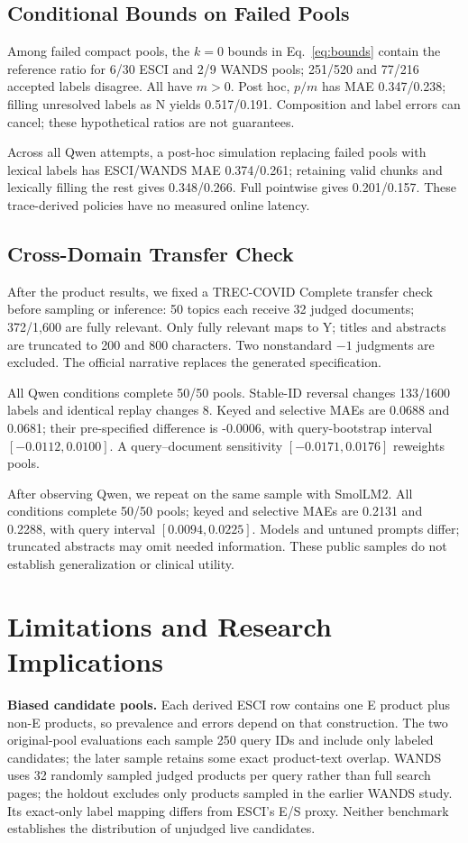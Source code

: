 \documentclass[conference]{IEEEtran}
\begin{document}
\subsection{Conditional Bounds on Failed Pools}
Among failed compact pools, the $k=0$ bounds in Eq.~\eqref{eq:bounds} contain the reference ratio for 6/30 ESCI and 2/9 WANDS pools; 251/520 and 77/216 accepted labels disagree. All have $m>0$. Post hoc, $p/m$ has MAE 0.347/0.238; filling unresolved labels as N yields 0.517/0.191. Composition and label errors can cancel; these hypothetical ratios are not guarantees.

Across all Qwen attempts, a post-hoc simulation replacing failed pools with lexical labels has ESCI/WANDS MAE 0.374/0.261; retaining valid chunks and lexically filling the rest gives 0.348/0.266. Full pointwise gives 0.201/0.157. These trace-derived policies have no measured online latency.

\subsection{Cross-Domain Transfer Check}
After the product results, we fixed a TREC-COVID Complete transfer check \cite{treccovid} before sampling or inference: 50 topics each receive 32 judged documents; 372/1,600 are fully relevant. Only fully relevant maps to Y; titles and abstracts are truncated to 200 and 800 characters. Two nonstandard $-1$ judgments are excluded. The official narrative replaces the generated specification.

All Qwen conditions complete 50/50 pools. Stable-ID reversal changes 133/1600 labels and identical replay changes 8. Keyed and selective MAEs are 0.0688 and 0.0681; their pre-specified difference is -0.0006, with query-bootstrap interval $[-0.0112,0.0100]$. A query--document sensitivity $[-0.0171,0.0176]$ reweights pools.

After observing Qwen, we repeat on the same sample with SmolLM2. All conditions complete 50/50 pools; keyed and selective MAEs are 0.2131 and 0.2288, with query interval $[0.0094,0.0225]$. Models and untuned prompts differ; truncated abstracts may omit needed information. These public samples do not establish generalization or clinical utility.

\section{Limitations and Research Implications}
\textbf{Biased candidate pools.} Each derived ESCI row contains one E product plus non-E products, so prevalence and errors depend on that construction. The two original-pool evaluations each sample 250 query IDs and include only labeled candidates; the later sample retains some exact product-text overlap. WANDS uses 32 randomly sampled judged products per query rather than full search pages; the holdout excludes only products sampled in the earlier WANDS study. Its exact-only label mapping differs from ESCI's E/S proxy. Neither benchmark establishes the distribution of unjudged live candidates.
\end{document}
